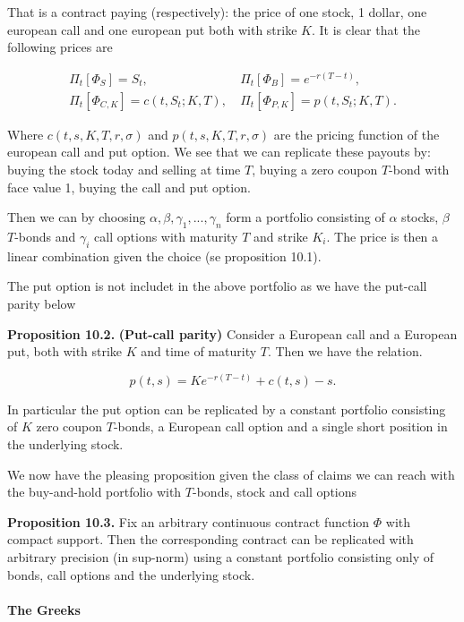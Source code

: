 \documentclass[
]{article}
\begin{document}
That is a contract paying (respectively): the price of one stock, 1
dollar, one european call and one european put both with strike \(K\).
It is clear that the following prices are

\begin{align*}
\Pi_t[\Phi_S]=S_t,&\ \Pi_t[\Phi_B]=e^{-r(T-t)},\\
\Pi_t[\Phi_{C,K}]=c(t,S_t;K,T),&\ \Pi_t[\Phi_{P,K}]=p(t,S_t;K,T).
\end{align*}

Where \(c(t,s,K,T,r,\sigma)\) and \(p(t,s,K,T,r,\sigma)\) are the
pricing function of the european call and put option. We see that we can
replicate these payouts by: buying the stock today and selling at time
\(T\), buying a zero coupon \(T\)-bond with face value 1, buying the
call and put option.

Then we can by choosing \(\alpha,\beta,\gamma_1,...,\gamma_n\) form a
portfolio consisting of \(\alpha\) stocks, \(\beta\) \(T\)-bonds and
\(\gamma_i\) call options with maturity \(T\) and strike \(K_i\). The
price is then a linear combination given the choice (se proposition
10.1).

The put option is not includet in the above portfolio as we have the
put-call parity below

\textbf{Proposition 10.2.} \textbf{(Put-call parity)} Consider a
European call and a European put, both with strike \(K\) and time of
maturity \(T\). Then we have the relation.

\[
p(t,s) = Ke^{-r(T-t)}+c(t,s)-s.
\]

In particular the put option can be replicated by a constant portfolio
consisting of \(K\) zero coupon \(T\)-bonds, a European call option and
a single short position in the underlying stock.

We now have the pleasing proposition given the class of claims we can
reach with the buy-and-hold portfolio with \(T\)-bonds, stock and call
options

\textbf{Proposition 10.3.} Fix an arbitrary continuous contract function
\(\Phi\) with compact support. Then the corresponding contract can be
replicated with arbitrary precision (in sup-norm) using a constant
portfolio consisting only of bonds, call options and the underlying
stock.

\hypertarget{the-greeks}{%
\paragraph{The Greeks}\label{the-greeks}}
\end{document}
